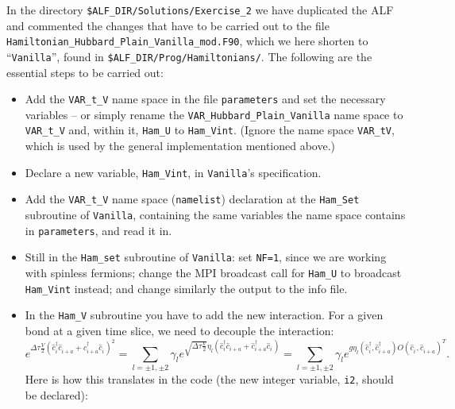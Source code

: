 \documentclass[10pt,modern]{scrartcl}
\numberwithin{exerciseitem}{exercise} %
\begin{document}
In the directory  \texttt{\$ALF\_DIR/Solutions/Exercise\_2} we have  duplicated the ALF and commented  the changes that have to be carried out to the file \texttt{Hamiltonian\_Hubbard\_Plain\_Vanilla\_mod.F90}, which we here shorten to ``\texttt{Vanilla}'', found in \texttt{\$ALF\_DIR/Prog/Hamiltonians/}. The following are the essential steps to be carried out:
\begin{itemize}
\item  Add the \texttt{VAR\_t\_V} name space in the file \texttt{parameters} and set the necessary variables -- or simply rename the \texttt{VAR\_Hubbard\_Plain\_Vanilla} name space to \texttt{VAR\_t\_V} and, within it, \texttt{Ham\_U} to \texttt{Ham\_Vint}. (Ignore the name space \texttt{VAR\_tV}, which is used by the general implementation mentioned above.)
\item  Declare a new variable, \texttt{Ham\_Vint}, in \texttt{Vanilla}'s specification.
\item Add the \texttt{VAR\_t\_V} name space (\texttt{namelist}) declaration at the \texttt{Ham\_Set} subroutine of \texttt{Vanilla}, containing the same variables the name space contains in \texttt{parameters}, and read it in.
\item  Still in the  \texttt{Ham\_set} subroutine of \texttt{Vanilla}: set \texttt{NF=1}, since we are working with spinless fermions; change the MPI broadcast call for \texttt{Ham\_U} to broadcast \texttt{Ham\_Vint} instead; and change similarly the output to the info file.
\item  In the \texttt{Ham\_V} subroutine you have to add the new interaction. For a given bond at a given time slice, we need to decouple the interaction: 
\begin{equation}
e^{\Delta \tau \frac{V}{2} \left( \hat{c}^{\dagger}_{i}  \hat{c}^{\phantom\dagger}_{i+a}      + \hat{c}^{\dagger}_{i+a}  \hat{c}^{\phantom\dagger}_{i} \right)^2} = 
\sum_{l= \pm1, \pm 2} \gamma_l e^{ \sqrt{\Delta \tau \frac{V}{2}}  \eta_l   \left( \hat{c}^{\dagger}_{i}  \hat{c}^{\phantom\dagger}_{i+a}      + \hat{c}^{\dagger}_{i+a}  \hat{c}^{\phantom\dagger}_{i} \right) } =  \sum_{l= \pm1, \pm 2} \gamma_l e^{ g  \eta_l   \left( \hat{c}^{\dagger}_{i},  \hat{c}^{\dagger}_{i+a}  \right)  O 
    \left(\hat{c}^{\phantom\dagger}_{i},  \hat{c}^{\phantom\dagger}_{i+a} \right)^{T} }.
\end{equation}
 Here is  how this translates in the code (the new integer variable, \texttt{i2}, should be declared): 
 

\end{itemize}
\end{document}
